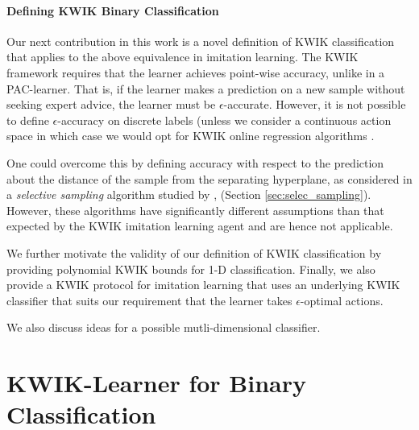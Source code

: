 \paragraph{Defining KWIK Binary Classification}
Our next contribution in this work is a novel definition of KWIK classification that applies to the above equivalence in imitation learning. The KWIK framework requires that the learner achieves point-wise accuracy, unlike in a PAC-learner. That is, if the learner makes a prediction on a new sample without seeking expert advice, the learner must be $\epsilon$-accurate. However, it is not possible to define $\epsilon$-accuracy on discrete labels (unless we consider a continuous action space in which case we would opt for KWIK online regression algorithms \citet{DBLP:conf/nips/StrehlL07}. 

One could overcome this by defining accuracy with respect to the prediction about the distance of the sample from the separating hyperplane, as considered in a \textit{selective sampling} algorithm studied by  \citet{Cesa-Bianchi:2009:RBC:1553374.1553390}, \citet{Dekel:2012:SSA:2503308.2503327} (Section \ref{sec:selec_sampling}). However, these algorithms have significantly different assumptions than that expected by the KWIK imitation learning agent and are hence not applicable. 

We further motivate the validity of our definition of KWIK classification by providing polynomial KWIK bounds for 1-D classification. Finally, we also provide a KWIK protocol for imitation learning that uses an underlying KWIK classifier that suits our requirement that the learner takes $\epsilon$-optimal actions.

We also discuss ideas for a possible mutli-dimensional classifier. 


\section{KWIK-Learner for Binary Classification}

